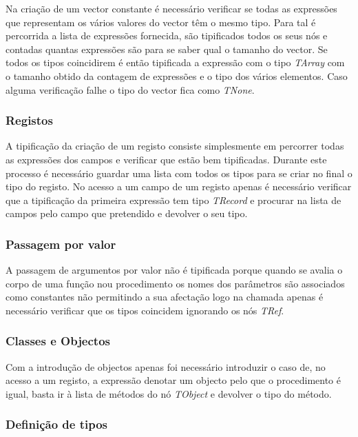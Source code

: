 Na criação de um vector constante é necessário verificar se todas as expressões 
que representam os vários valores do vector têm o mesmo tipo. Para tal é 
percorrida a lista de expressões fornecida, são tipificados todos os seus nós e 
contadas quantas expressões são para se saber qual o tamanho do vector. Se 
todos os tipos coincidirem é então tipificada a expressão com o tipo 
\emph{TArray} com o tamanho obtido da contagem de expressões e o tipo dos 
vários elementos. Caso alguma verificação falhe o tipo do vector fica como 
\emph{TNone}.

\subsubsection{Registos}

A tipificação da criação de um registo consiste simplesmente em percorrer todas 
as expressões dos campos e verificar que estão bem tipificadas. Durante este 
processo é necessário guardar uma lista com todos os tipos para se criar no 
final o tipo do registo. No acesso a um campo de um registo apenas é 
necessário verificar que a tipificação da primeira expressão tem tipo 
\emph{TRecord} e procurar na lista de campos pelo campo que pretendido e 
devolver o seu tipo.

\subsubsection{Passagem por valor}

A passagem de argumentos por valor não é tipificada porque quando se avalia o 
corpo de uma função nou procedimento os nomes dos parâmetros são associados 
como constantes não permitindo a sua afectação logo na chamada apenas é 
necessário verificar que os tipos coincidem ignorando os nós \emph{TRef}.

\subsubsection{Classes e Objectos}

Com a introdução de objectos apenas foi necessário introduzir o caso de, no 
acesso a um registo, a expressão denotar um objecto pelo que o procedimento é 
igual, basta ir à lista de métodos do nó \emph{TObject} e devolver o tipo do 
método.

\subsubsection{Definição de tipos}

